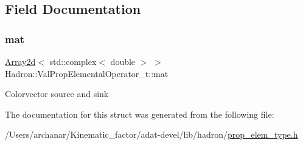 \subsection{Field Documentation}
\mbox{\label{structHadron_1_1ValPropElementalOperator__t_aee3c0c872145b334c5ee5dbd0f2e0f2d}} 
\subsubsection{\texorpdfstring{mat}{mat}}
{\footnotesize\ttfamily \mbox{\hyperlink{classXMLArray_1_1Array2d}{Array2d}}$<$ std\+::complex$<$ double $>$ $>$ Hadron\+::\+Val\+Prop\+Elemental\+Operator\+\_\+t\+::mat}

Colorvector source and sink 

The documentation for this struct was generated from the following file\+:\begin{DoxyCompactItemize}
\item 
/\+Users/archanar/\+Kinematic\+\_\+factor/adat-\/devel/lib/hadron/\mbox{\hyperlink{adat-devel_2lib_2hadron_2prop__elem__type_8h}{prop\+\_\+elem\+\_\+type.\+h}}\end{DoxyCompactItemize}
